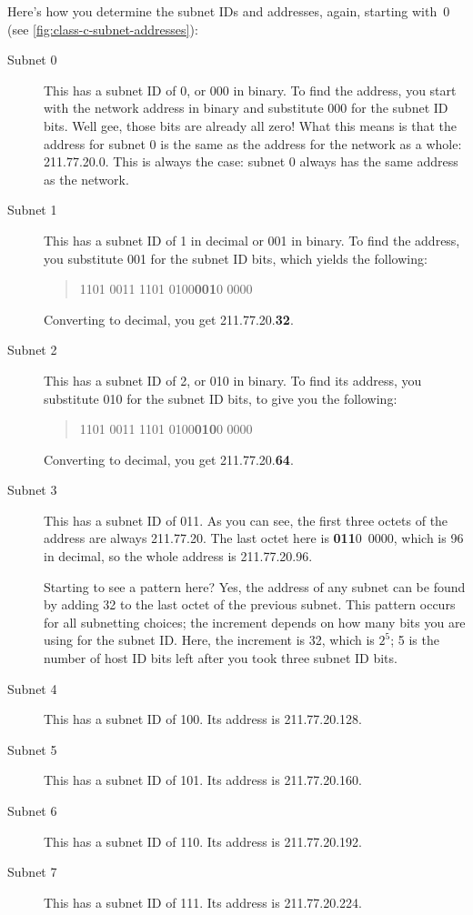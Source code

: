 Here's how you determine the subnet IDs and addresses, again, starting with~0 (see \cref{fig:class-c-subnet-addresses}):
\begin{description}
   \item[Subnet 0]
      This has a subnet ID of 0, or 000 in binary.
      To find the address, you start with the network address in binary and substitute 000 for the subnet ID bits.
      Well gee, those bits are already all zero!
      What this means is that the address for subnet 0 is the same as the address for the network as a whole: 211.77.20.0.
      This is always the case: subnet 0 always has the same address as the network.

   \item[Subnet 1]
      This has a subnet ID of 1 in decimal or 001 in binary.
      To find the address, you substitute 001 for the subnet ID bits, which yields the following:
      \begin{quote}
         1101 0011 1101 0100\quad \textbf{001}0 0000
      \end{quote}
      Converting to decimal, you get 211.77.20.\textbf{32}.

   \item[Subnet 2]
      This has a subnet ID of 2, or 010 in binary.
      To find its address, you substitute 010 for the subnet ID bits, to give you the following:
      \begin{quote}
         1101 0011 1101 0100\quad \textbf{010}0 0000
      \end{quote}
      Converting to decimal, you get 211.77.20.\textbf{64}.

   \item[Subnet 3]
      This has a subnet ID of 011.
      As you can see, the first three octets of the address are always 211.77.20.
      The last octet here is \textbf{011}0~0000, which is 96 in decimal, so the whole address is 211.77.20.96.

      Starting to see a pattern here?
      Yes, the address of any subnet can be found by adding 32 to the last octet of the previous subnet.
      This pattern occurs for all subnetting choices; the increment depends on how many bits you are using for the subnet ID.
      Here, the increment is 32, which is $2^5$; 5 is the number of host ID bits left after you took three subnet ID bits.

   \item[Subnet 4]
      This has a subnet ID of 100.
      Its address is 211.77.20.128.

   \item[Subnet 5]
      This has a subnet ID of 101.
      Its address is 211.77.20.160.

   \item[Subnet 6]
      This has a subnet ID of 110.
      Its address is 211.77.20.192.

   \item[Subnet 7]
      This has a subnet ID of 111.
      Its address is 211.77.20.224.
\end{description}
 

